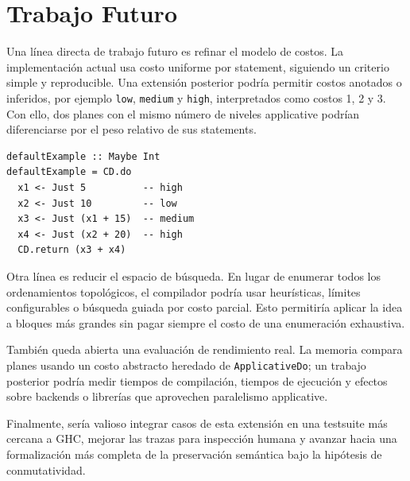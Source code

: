 
\section{Trabajo Futuro}

Una línea directa de trabajo futuro es refinar el modelo de costos. La implementación actual usa costo uniforme por statement, siguiendo un criterio simple y reproducible. Una extensión posterior podría permitir costos anotados o inferidos, por ejemplo \texttt{low}, \texttt{medium} y \texttt{high}, interpretados como costos 1, 2 y 3. Con ello, dos planes con el mismo número de niveles applicative podrían diferenciarse por el peso relativo de sus statements.

\begin{verbatim}
defaultExample :: Maybe Int
defaultExample = CD.do
  x1 <- Just 5          -- high
  x2 <- Just 10         -- low
  x3 <- Just (x1 + 15)  -- medium
  x4 <- Just (x2 + 20)  -- high
  CD.return (x3 + x4)
\end{verbatim}

Otra línea es reducir el espacio de búsqueda. En lugar de enumerar todos los ordenamientos topológicos, el compilador podría usar heurísticas, límites configurables o búsqueda guiada por costo parcial. Esto permitiría aplicar la idea a bloques más grandes sin pagar siempre el costo de una enumeración exhaustiva.

También queda abierta una evaluación de rendimiento real. La memoria compara planes usando un costo abstracto heredado de \texttt{ApplicativeDo}; un trabajo posterior podría medir tiempos de compilación, tiempos de ejecución y efectos sobre backends o librerías que aprovechen paralelismo applicative.

Finalmente, sería valioso integrar casos de esta extensión en una testsuite más cercana a \textsf{GHC}, mejorar las trazas para inspección humana y avanzar hacia una formalización más completa de la preservación semántica bajo la hipótesis de conmutatividad.
